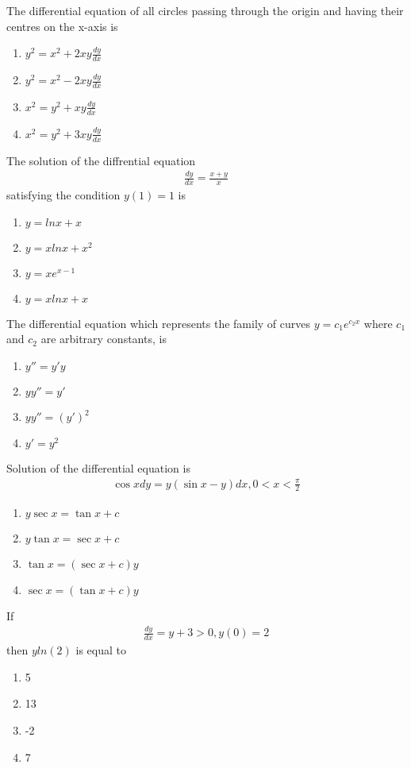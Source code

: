 \item The differential equation of all circles passing through the origin and having their centres on the x-axis is
\begin{enumerate}
\item $y^2 = x^2 + 2xy\frac{dy}{dx}$
\item $y^2 = x^2 - 2xy\frac{dy}{dx}$
\item $x^2 = y^2 + xy\frac{dy}{dx}$
\item $x^2 = y^2 + 3xy\frac{dy}{dx}$
\end{enumerate}

\item The solution of the diffrential equation
\begin{align*}
\frac{dy}{dx} = \frac{x + y}{x}
\end{align*}
satisfying the condition $y(1) = 1$ is
\begin{enumerate}
\item $y = lnx + x$
\item $y = xlnx + x^2$
\item $y = xe^{x - 1}$
\item $y = xlnx + x$
\end{enumerate}

\item The differential equation which represents the family of curves $y = c_1e^{c_2x}$ where $c_1$ and $c_2$ are arbitrary constants, is
\begin{enumerate}
\item $y'' = y'y$
\item $yy'' = y'$
\item $yy'' = (y')^2$
\item $y' = y^2$
\end{enumerate} 

\item Solution of the differential equation is
\begin{align*}
\cos xdy = y(\sin x - y)dx, 0 < x < \frac{\pi}{2}
\end{align*}
\begin{enumerate}
\item $y\sec x = \tan x + c$
\item $y\tan x = \sec x + c$
\item $\tan x = (\sec x + c)y$
\item $\sec x = (\tan x + c)y$
\end{enumerate}

\item If 
\begin{align*}
\frac{dy}{dx} = y + 3 > 0, y(0) = 2
\end{align*}
then $yln(2)$ is equal to
\begin{enumerate}
\item 5
\item 13
\item -2
\item 7
\end{enumerate}


